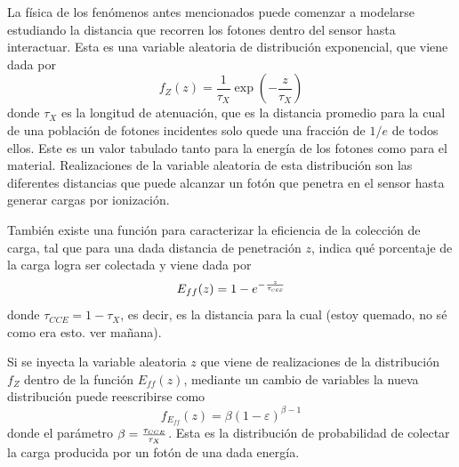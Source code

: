 La física de los fenómenos antes mencionados puede comenzar a modelarse estudiando la distancia que recorren los fotones dentro del sensor hasta interactuar. Esta es una variable aleatoria de distribución exponencial, que viene dada por
\begin{equation*}
    f_{Z}(z) = \frac{1}{\tau_{X}}\exp(-\frac{z}{\tau_{X}})
\end{equation*}
donde $\tau_{X}$ es la longitud de atenuación, que es la distancia promedio para la cual de una población de fotones incidentes solo quede una fracción de $1/e$ de todos ellos. Este es un valor tabulado tanto para la energía de los fotones como para el material. Realizaciones de la variable aleatoria de esta distribución son las diferentes distancias que puede alcanzar un fotón que penetra en el sensor hasta generar cargas por ionización.

También existe una función para caracterizar la eficiencia de la colección de carga, tal que para una dada distancia de penetración $z$, indica qué porcentaje de la carga logra ser colectada y viene dada por
\begin{equation*}
    E_{ff}(z) = 1 - e^{-\frac{z}{\tau_{\scaleto{CEE}{2pt}}}}
\end{equation*}
donde $\tau_{CCE} = 1 - \tau_{X}$, es decir, es la distancia para la cual (estoy quemado, no sé como era esto. ver mañana). 

Si se inyecta la variable aleatoria $z$ que viene de realizaciones de la distribución $f_{Z}$ dentro de la función $E_{ff}(z)$, mediante un cambio de variables la nueva distribución puede reescribirse como
\begin{equation*}
    f_{E_{ff}}(z) = \beta (1 - \varepsilon)^{\beta - 1}
\end{equation*}
donde el parámetro $\beta = \frac{\tau_{\scaleto{CCE}{3pt}}}{\tau_{X}}$. Esta es la distribución de probabilidad de colectar la carga producida por un fotón de una dada energía.

